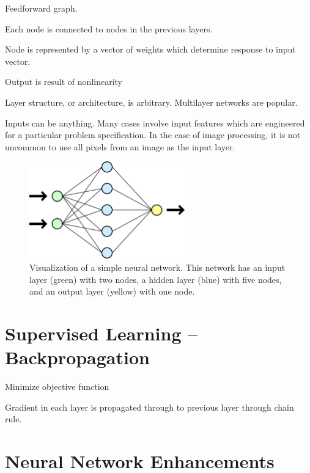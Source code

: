 Feedforward graph. \cite{reed1999neural}

Each node is connected to nodes in the previous layers.

Node is represented by a vector of weights which determine response to input vector.


Output is result of nonlinearity

Layer structure, or architecture, is arbitrary.  Multilayer networks are popular.


Inputs can be anything.  Many cases involve input features which are engineered for a particular problem specification.  In the case of image processing, it is not uncommon to use all pixels from an image as the input layer.

\begin{figure}[t]
  \begin{center}
    \includegraphics[width=0.6\textwidth]{figures/figures/basicNN.png}
  \end{center}
  \caption[Visualization of a simple neural network ]{Visualization of a simple neural network.  This network has an input layer (green) with two nodes, a hidden layer (blue) with five nodes, and an output layer (yellow) with one node.}

  \label{nnet}
\end{figure}


\section{Supervised Learning -- Backpropagation}


Minimize objective function

Gradient in each layer is propagated through to previous layer through chain rule.



\section{Neural Network Enhancements}

